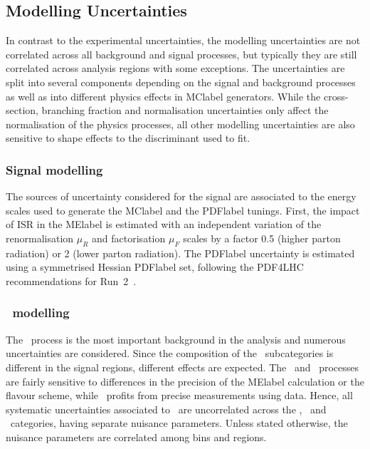 \subsection{Modelling Uncertainties}
In contrast to the experimental uncertainties, the modelling uncertainties are not correlated across all background and signal processes, but typically they are still correlated across analysis regions with some exceptions. The uncertainties are split into several components depending on the signal and background processes as well as into different physics effects in \acrshort{MClabel} generators. While the cross-section, branching fraction and normalisation uncertainties only affect the normalisation of the physics processes, all other modelling uncertainties are also sensitive to shape effects to the discriminant used to fit.


\subsubsection{Signal modelling}

The sources of uncertainty considered for the signal are associated to the energy scales used to generate the \acrshort{MClabel} and the \acrshort{PDFlabel} tunings. First, the impact of ISR in the \acrshort{MElabel} is estimated with an independent variation of the renormalisation $\mu_R$ and factorisation $\mu_F$ scales by a factor 0.5 (higher parton radiation) or 2 (lower parton radiation). The \acrshort{PDFlabel} uncertainty is estimated using a symmetrised Hessian \acrshort{PDFlabel} set, following the PDF4LHC recommendations for Run~2~\cite{Butterworth_2016}.

\subsubsection{\ttbar\ modelling}
\label{Hplustb:Sectionttbarmodelling}
The \ttbar\ process is the most important background in the analysis and numerous uncertainties are considered. Since the composition of the \ttbar\ subcategories is different in the signal regions, different effects are expected. The \ttb\ and \ttc\ processes are fairly sensitive to differences in the precision of the \acrshort{MElabel} calculation or the flavour scheme, while \ttl\ profits from precise measurements using data. Hence, all systematic uncertainties associated to \ttbar\ are uncorrelated across the \ttb, \ttc\ and \ttl\ categories, having separate nuisance parameters. Unless stated otherwise, the nuisance parameters are correlated among bins and regions.\\

